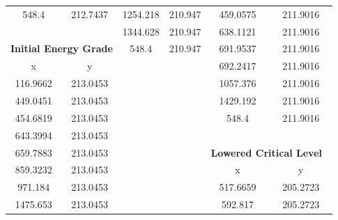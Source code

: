 \begin{center}
\begin{tabular}{|cc|cc|cc|}
        548.4    & 212.7437                                      & 1254.218 & 210.947                                   & 459.0575 & 211.9016                                          \\
                 &                                               & 1344.628 & 210.947                                   & 638.1121 & 211.9016                                          \\
        \multicolumn{2}{|c|}{\textbf{Initial Energy Grade }}     & 548.4    & 210.947                                   & 691.9537 & 211.9016                                          \\ 
        \cline{1-2}
        x        & y                                             &          &                                           & 692.2417 & 211.9016                                          \\
        116.9662 & 213.0453                                      &          &                                           & 1057.376 & 211.9016                                          \\
        449.0451 & 213.0453                                      &          &                                           & 1429.192 & 211.9016                                          \\
        454.6819 & 213.0453                                      &          &                                           & 548.4    & 211.9016                                          \\
        643.3994 & 213.0453                                      &          &                                           &          &                                                   \\
        659.7883 & 213.0453                                      &          &                                           & \multicolumn{2}{c|}{\textbf{Lowered Critical Level~ }}      \\ 
        \cline{5-6}
        859.3232 & 213.0453                                      &          &                                           & x        & y                                                 \\
        971.184  & 213.0453                                      &          &                                           & 517.6659 & 205.2723                                          \\
        1475.653 & 213.0453                                      &          &                                           & 592.817  & 205.2723                                          \\

\end{tabular}
\end{center}
